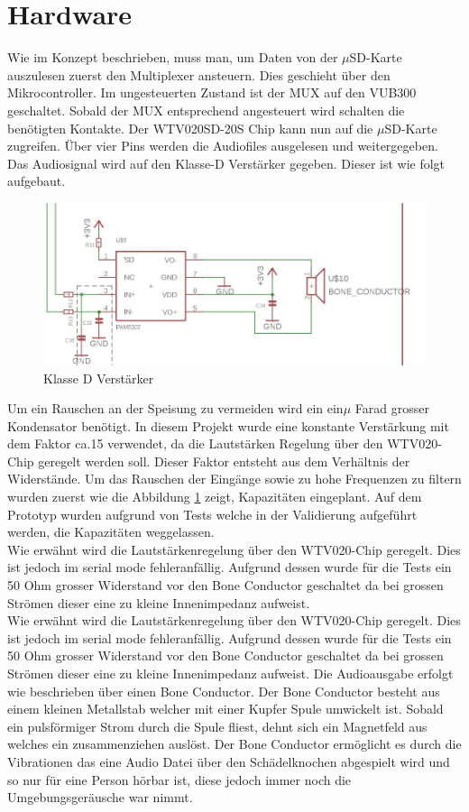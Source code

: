 \section{Hardware}
Wie im Konzept beschrieben, muss man, um Daten von der $\mu$SD-Karte auszulesen zuerst den Multiplexer ansteuern. Dies geschieht über den Mikrocontroller. Im ungesteuerten Zustand ist der MUX auf den VUB300 geschaltet. Sobald der MUX entsprechend angesteuert wird schalten die benötigten Kontakte. Der WTV020SD-20S Chip kann nun auf die $\mu$SD-Karte zugreifen. Über vier Pins werden die Audiofiles ausgelesen und weitergegeben. Das Audiosignal wird auf den Klasse-D Verstärker gegeben. Dieser ist wie folgt aufgebaut.
\begin{figure}[h]
	\centering
	\includegraphics[width=15cm]{Bilder/Klasse-D.jpg}
	\caption{Klasse D Verstärker}
	\label{Klasse-D}
\end{figure}
Um ein Rauschen an der Speisung zu vermeiden wird ein ein$\mu$ Farad grosser Kondensator benötigt. In diesem Projekt wurde eine konstante Verstärkung mit dem Faktor ca.15 verwendet, da die Lautstärken Regelung über den WTV020-Chip geregelt werden soll. Dieser Faktor entsteht aus dem Verhältnis der Widerstände. Um das Rauschen der Eingänge sowie zu hohe Frequenzen zu filtern wurden zuerst wie die Abbildung \ref{Klasse-D} zeigt, Kapazitäten eingeplant. Auf dem Prototyp wurden aufgrund von Tests welche in der Validierung aufgeführt werden, die Kapazitäten weggelassen.\\ Wie erwähnt wird die Lautstärkenregelung über den WTV020-Chip geregelt. Dies ist jedoch im serial mode fehleranfällig. Aufgrund dessen wurde für die Tests ein 50 Ohm grosser Widerstand vor den Bone Conductor geschaltet da bei grossen Strömen dieser eine zu kleine Innenimpedanz aufweist.\\ Wie erwähnt wird die Lautstärkenregelung über den WTV020-Chip geregelt. Dies ist jedoch im serial mode fehleranfällig. Aufgrund dessen wurde für die Tests ein 50 Ohm grosser Widerstand vor den Bone Conductor geschaltet da bei grossen Strömen dieser eine zu kleine Innenimpedanz aufweist. Die Audioausgabe erfolgt wie beschrieben über einen Bone Conductor. Der Bone Conductor besteht aus einem kleinen Metallstab welcher mit einer Kupfer Spule umwickelt ist. Sobald ein pulsförmiger Strom durch die Spule fliest, dehnt sich ein Magnetfeld aus welches ein zusammenziehen auslöst. Der Bone Conductor ermöglicht es durch die Vibrationen das eine Audio Datei über den Schädelknochen abgespielt wird und so nur für eine Person hörbar ist, diese jedoch immer noch die Umgebungsgeräusche war nimmt.

